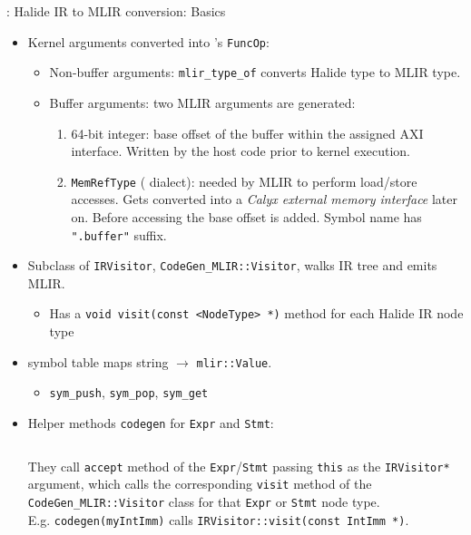 \documentclass[8pt,a4paper,oneside,hidelinks,aspectratio=169,dvipsnames]{beamer}
\newcommand{\code}[1]{\texttt{\detokenize{#1}}}
\newcommand{\codecpp}[1]{\texttt{#1}}
\begin{document}
\begin{frame}{\code{CodeGen_MLIR}: Halide IR to MLIR conversion: Basics}
  \begin{itemize}
    \item Kernel arguments converted into \code{func}'s \codecpp{FuncOp}:
          \begin{itemize}
            \item Non-buffer arguments: \codecpp{mlir_type_of} converts Halide type to MLIR type.
            \item Buffer arguments: two MLIR arguments are generated:
                  \begin{enumerate}
                    \item 64-bit integer: base offset of the buffer within the assigned AXI interface. Written by the host code prior to kernel execution.
                    \item \codecpp{MemRefType} (\code{Memref} dialect): needed by MLIR to perform load/store accesses. Gets converted into a \textit{Calyx external memory interface} later on. Before accessing the base offset is added. Symbol name has \codecpp{".buffer"} suffix.
                  \end{enumerate}
          \end{itemize}
    \item Subclass of \codecpp{IRVisitor}, \codecpp{CodeGen_MLIR::Visitor}, walks IR tree and emits MLIR.
          \begin{itemize}
            \item Has a \codecpp{void visit(const <NodeType> *)} method for each Halide IR node type
          \end{itemize}
    \item {} symbol table maps string $\rightarrow$ \codecpp{mlir::Value}.
          \begin{itemize}
            \item \codecpp{sym_push}, \codecpp{sym_pop}, \codecpp{sym_get}
          \end{itemize}
    \item Helper methods \codecpp{codegen} for \codecpp{Expr} and \codecpp{Stmt}:
          \begin{figure}[H]
            \centering
            \begin{minipage}{0.3\textwidth}
              \inputminted[tabsize=2,frame=single,rulecolor=gray,fontsize=\fontsize{6}{6}]{cpp}{fig/codegen_methods.cpp}
            \end{minipage}
          \end{figure}
          They call \codecpp{accept} method of the \codecpp{Expr}/\codecpp{Stmt} passing \codecpp{this} as the \codecpp{IRVisitor*} argument, which calls the corresponding \codecpp{visit} method of the \codecpp{CodeGen_MLIR::Visitor} class for that \codecpp{Expr} or \codecpp{Stmt} node type.\\
          E.g. \codecpp{codegen(myIntImm)} calls \codecpp{IRVisitor::visit(const IntImm *)}.
  \end{itemize}
\end{frame}
\end{document}
